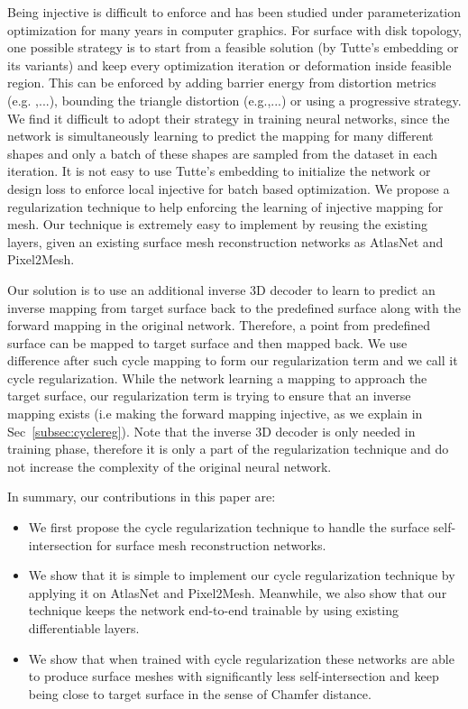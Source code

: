 Being injective is difficult to enforce and has been studied under parameterization optimization for many years in computer graphics. For surface with disk topology, one possible strategy is to start from a feasible solution (by Tutte's embedding\cite{tutte} or its variants) and keep every optimization iteration or deformation inside feasible region. This can be enforced by adding barrier energy from distortion metrics (e.g. \cite{provableplanarmapping,lifted_bijection},...), bounding the triangle distortion (e.g.\cite{freeboundary,boundeddistortion},...)
or using a progressive strategy\cite{Liu_PP_2018}.
We find it difficult to adopt their strategy in training neural networks, since the network is simultaneously learning to predict the mapping for many different shapes and only a batch of these shapes are sampled from the dataset in each iteration. It is not easy to use Tutte's embedding to initialize the network or design loss to enforce local injective for batch based optimization. We propose a regularization technique to help enforcing the learning of injective mapping for mesh. Our technique is extremely easy to implement by reusing the existing layers, given an existing surface mesh reconstruction networks as AtlasNet\cite{atlasnet} and Pixel2Mesh\cite{pixel2mesh}.  

 Our solution is to use an additional inverse 3D decoder to learn to predict an inverse mapping from target surface back to the predefined surface along with the forward mapping in the original network. Therefore, a point from predefined surface can be mapped to target surface and then mapped back. We use difference after such cycle mapping to form our regularization term and we call it cycle regularization. While the network learning a mapping to approach the target surface, our regularization term is trying to ensure that an inverse mapping exists (i.e making the forward mapping injective, as we explain in Sec~\ref{subsec:cyclereg}).
Note that the inverse 3D decoder is only needed in training phase, therefore it is only a part of the regularization technique and do not increase the complexity of the original neural network.

In summary, our contributions in this paper are:
\begin{itemize}
	\item We first propose the cycle regularization technique to handle the surface self-intersection for surface mesh reconstruction networks. 
	\item We show that it is simple to implement our cycle regularization technique by applying it on AtlasNet\cite{atlasnet} and Pixel2Mesh\cite{pixel2mesh}. Meanwhile, we also show that our technique keeps the network end-to-end trainable by using existing differentiable layers.
	\item We show that when trained with cycle regularization these networks are able to produce surface meshes with significantly less self-intersection and keep being close to target surface in the sense of Chamfer distance.
\end{itemize}




 